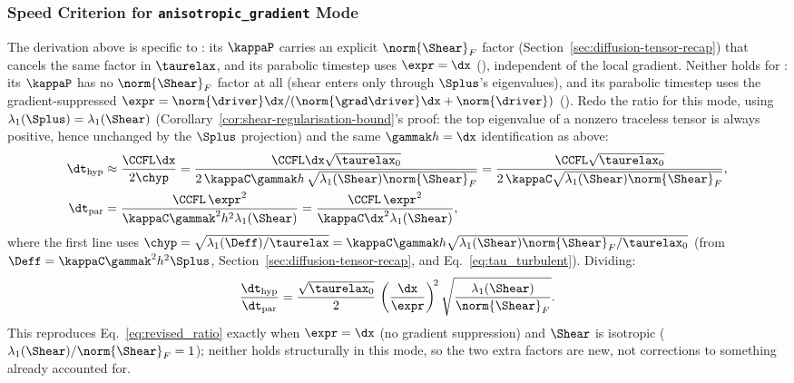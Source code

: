 \subsubsection{Speed Criterion for \texttt{anisotropic\_gradient} Mode}
\label{sec:speed-criterion-aniso}
The derivation above is specific to : its
$\kappaP$ carries an explicit $\norm{\Shear}_F$ factor
(Section~\ref{sec:diffusion-tensor-recap}) that cancels the same factor
in $\taurelax$, and its parabolic timestep uses $\expr=\dx$
(), independent of the local
gradient. Neither holds for : its $\kappaP$
has no $\norm{\Shear}_F$ factor at all (shear enters only through
$\Splus$'s eigenvalues), and its parabolic timestep uses the
gradient-suppressed
$\expr=\norm{\driver}\dx/(\norm{\grad\driver}\dx+\norm{\driver})$
(). Redo the ratio for this mode,
using $\lambda_1(\Splus)=\lambda_1(\Shear)$ (Corollary~\ref{cor:shear-regularisation-bound}'s
proof: the top eigenvalue of a nonzero traceless tensor is always
positive, hence unchanged by the $\Splus$ projection) and the same
$\gammak h=\dx$ identification as above:
\begin{align}
  \dt_{\rm hyp} &\approx \frac{\CCFL\dx}{2\chyp}
  = \frac{\CCFL\dx\sqrt{\taurelax_0}}{2\,\kappaC\gammak h\,\sqrt{\lambda_1(\Shear)\norm{\Shear}_F}}
  = \frac{\CCFL\sqrt{\taurelax_0}}{2\,\kappaC\sqrt{\lambda_1(\Shear)\norm{\Shear}_F}} , \\
  \dt_{\rm par} &= \frac{\CCFL\,\expr^2}{\kappaC\gammak^2h^2\lambda_1(\Shear)}
  = \frac{\CCFL\,\expr^2}{\kappaC\dx^2\lambda_1(\Shear)} ,
\end{align}
where the first line uses
$\chyp=\sqrt{\lambda_1(\Deff)/\taurelax}=\kappaC\gammak h\sqrt{\lambda_1(\Shear)\norm{\Shear}_F/\taurelax_0}$
(from $\Deff=\kappaC\gammak^2h^2\Splus$,
Section~\ref{sec:diffusion-tensor-recap}, and
Eq.~\eqref{eq:tau_turbulent}). Dividing:
\begin{equation}
  \label{eq:aniso_ratio}
  \frac{\dt_{\rm hyp}}{\dt_{\rm par}}
  = \frac{\sqrt{\taurelax_0}}{2}\,\left(\frac{\dx}{\expr}\right)^{\!2}
  \sqrt{\frac{\lambda_1(\Shear)}{\norm{\Shear}_F}} .
\end{equation}
This reproduces Eq.~\eqref{eq:revised_ratio} exactly when
$\expr=\dx$ (no gradient suppression) and $\Shear$ is isotropic
($\lambda_1(\Shear)/\norm{\Shear}_F=1$); neither holds structurally in
this mode, so the two extra factors are new, not corrections to
something already accounted for.

